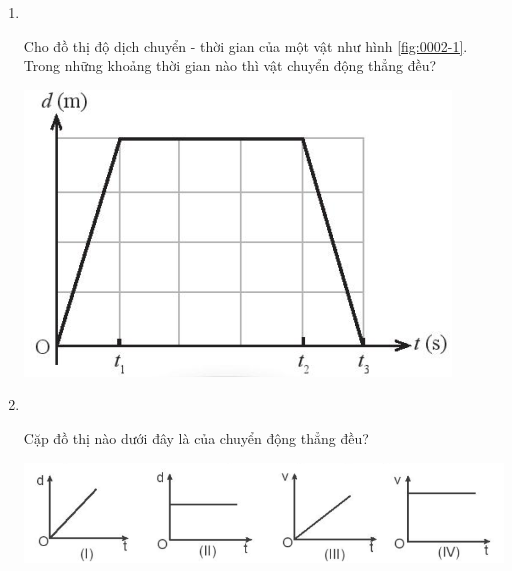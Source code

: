 \begin{enumerate}[label=\bfseries Câu \arabic*:]
{}

\item {}\\
{Cho đồ thị độ dịch chuyển - thời gian của một vật như hình \ref{fig:0002-1}. Trong những khoảng thời gian nào thì vật chuyển động thẳng đều?
	\begin{center}
		\includegraphics[width=0.3\linewidth]{../figs/VN10-2023-PH-TP0002-1}
		\label{fig:0002-1}
	\end{center}

}

\item {}\\
{Cặp đồ thị nào dưới đây là của chuyển động thẳng đều?
	\begin{center}
		\includegraphics[width=0.7\linewidth]{../figs/VN10-2023-PH-TP0002-9}
	\end{center}
}


\end{enumerate}
